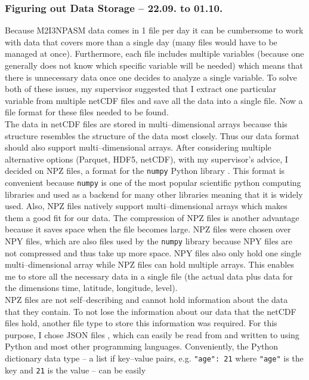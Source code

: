 \documentclass[../00_main.tex]{subfiles}
\begin{document}
\subsubsection{Figuring out Data Storage -- 22.09. to 01.10.}

Because M2I3NPASM data comes in 1 file per day it can be cumbersome to work
with data that covers more than a single day (many files would have to be managed
at once). Furthermore, each file includes multiple variables (because one
generally does not know which specific variable will be needed) which means
that there is unnecessary data once one decides to analyze a single variable.
To solve both of these issues, my supervisor suggested that I extract one
particular variable from multiple netCDF files and save all the data into
a single file. Now a file format for these files needed to be found.\\
The data in netCDF files are stored in multi--dimensional arrays because this
structure resembles the structure of the data most closely. Thus our data
format should also support multi--dimensional arrays. After
considering multiple alternative options (Parquet, HDF5, netCDF), with my
supervisor's advice, I decided on NPZ files, a format for the \texttt{numpy} 
Python library \cite{py-numpy}. This format is convenient because \texttt{numpy} is one of the 
most popular scientific python computing libraries and used as a backend for 
many other libraries meaning that it is widely used. Also, NPZ files natively
support multi--dimensional arrays which makes them a good fit for our data. 
The compression of NPZ files is another advantage because it saves space when 
the file becomes large. NPZ files were chosen over NPY files, which are also 
files used by the \texttt{numpy} library because NPY files are not compressed 
and thus take up more space. NPY files also only hold one single
multi--dimensional array while NPZ files can hold multiple arrays. This enables
me to store all the necessary data in a single file (the actual data plus data
for the dimensions time, latitude, longitude, level).\\
NPZ files are not self--describing and cannot hold information
about the data that they contain. To not lose the information about our data
that the netCDF files hold, another file type to store this information was
required. For this purpose, I chose JSON files \cite{json}, which can easily be read from
and written to using Python and most other programming languages. Conveniently,
the Python dictionary data type \cite{py-dict} -- a list if key--value pairs, e.g. \texttt{"age":
21} where \texttt{"age"} is the key and \texttt{21} is the value -- can be easily
\end{document}
